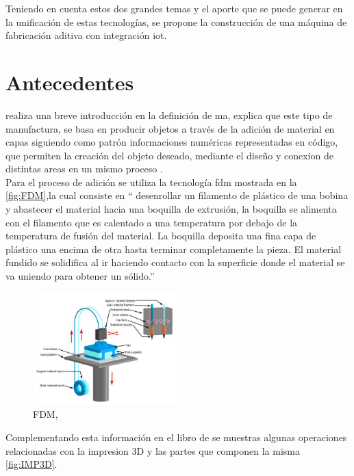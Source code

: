 Teniendo en cuenta estos dos grandes temas y el aporte que se puede generar en la unificación de estas tecnologías, se propone la construcción de una máquina  de fabricación aditiva con integración \acrshort{iot}. 




\section{Antecedentes}  \label{antecedentes}

\citep{blaquez} realiza una breve introducción en la definición de \acrshort{ma}, explica que este tipo de manufactura, se basa en producir objetos a través de la adición de material en capas siguiendo como patrón informaciones numéricas representadas en código, que permiten la creación del objeto deseado, mediante el diseño y conexion de distintas areas en un mismo proceso .\\

Para el proceso de adición se utiliza la tecnología \acrshort{fdm} mostrada en la \autoref{fig:FDM},la cual consiste en “ desenrollar un filamento de plástico de una bobina y abastecer
el material hacia una boquilla de extrusión, la boquilla se
alimenta con el filamento que es calentado a una temperatura
por debajo de la temperatura de fusión del material. La boquilla
deposita una fina capa de plástico una encima de otra hasta
terminar completamente la pieza. El material fundido se
solidifica al ir haciendo contacto con la superficie donde el
material se va uniendo para obtener un sólido.''\citep{acuna} 

\begin{figure}[H]
    \centering
    \includegraphics[width=0.5\textwidth]{Figs/FDU.PNG}
    \caption{FDM, \citep{blaquez}}
     \label{fig:FDM}
\end{figure}

Complementando esta información en el libro de \citep{berchon} se muestras algunas operaciones relacionadas con la impresion 3D y las partes que componen la misma \autoref{fig:IMP3D}. \\

